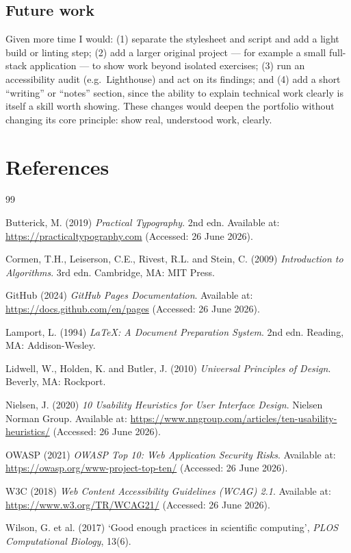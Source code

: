 \documentclass[11pt,a4paper]{article}
\begin{document}
\subsection{Future work}
Given more time I would: (1) separate the stylesheet and script and add a light build or
linting step; (2) add a larger original project --- for example a small full-stack
application --- to show work beyond isolated exercises; (3) run an accessibility audit
(e.g.\ Lighthouse) and act on its findings; and (4) add a short ``writing'' or
``notes'' section, since the ability to explain technical work clearly is itself a skill
worth showing. These changes would deepen the portfolio without changing its core
principle: show real, understood work, clearly.

\section*{References}
\begin{thebibliography}{99}
\setlength{\itemsep}{2pt}

Butterick, M. (2019) \emph{Practical Typography}. 2nd edn. Available at: \url{https://practicaltypography.com} (Accessed: 26 June 2026).

Cormen, T.H., Leiserson, C.E., Rivest, R.L. and Stein, C. (2009) \emph{Introduction to Algorithms}. 3rd edn. Cambridge, MA: MIT Press.

GitHub (2024) \emph{GitHub Pages Documentation}. Available at: \url{https://docs.github.com/en/pages} (Accessed: 26 June 2026).

Lamport, L. (1994) \emph{LaTeX: A Document Preparation System}. 2nd edn. Reading, MA: Addison-Wesley.

Lidwell, W., Holden, K. and Butler, J. (2010) \emph{Universal Principles of Design}. Beverly, MA: Rockport.

Nielsen, J. (2020) \emph{10 Usability Heuristics for User Interface Design}. Nielsen Norman Group. Available at: \url{https://www.nngroup.com/articles/ten-usability-heuristics/} (Accessed: 26 June 2026).

OWASP (2021) \emph{OWASP Top 10: Web Application Security Risks}. Available at: \url{https://owasp.org/www-project-top-ten/} (Accessed: 26 June 2026).

W3C (2018) \emph{Web Content Accessibility Guidelines (WCAG) 2.1}. Available at: \url{https://www.w3.org/TR/WCAG21/} (Accessed: 26 June 2026).

Wilson, G. et al. (2017) `Good enough practices in scientific computing', \emph{PLOS Computational Biology}, 13(6).

\end{thebibliography}
\end{document}
